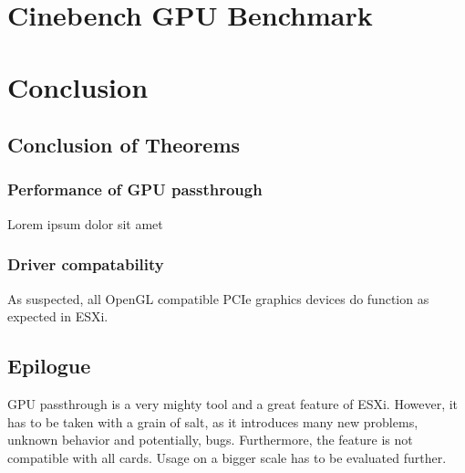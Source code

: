 \documentclass[12pt,a4paper]{report}
\begin{document}
\section{Cinebench GPU Benchmark}


\begin{comment}
 TODO: Add real benchmark for 'VM - GTX 1050 Ti'
\end{comment}

\section{Conclusion}

\subsection{Conclusion of Theorems}

\subsubsection{Performance of GPU passthrough}
Lorem ipsum dolor sit amet

\subsubsection{Driver compatability}
As suspected, all OpenGL compatible PCIe graphics devices do function as expected in ESXi.

\subsection{Epilogue}

GPU passthrough is a very mighty tool and a great feature of ESXi. However, it has to be taken with a grain of salt, as it introduces many new problems, unknown behavior and potentially, bugs. Furthermore, the feature is not compatible with all cards. Usage on a bigger scale has to be evaluated further.
\end{document}
